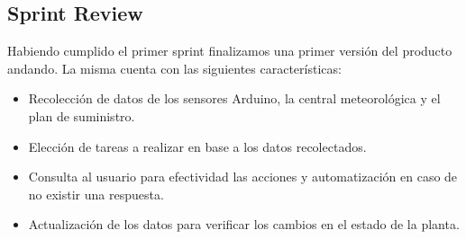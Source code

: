 \subsection{Sprint Review}
Habiendo cumplido el primer sprint finalizamos una primer versión del producto andando. 
La misma cuenta con las siguientes características:
\begin{itemize}
\item Recolección de datos de los sensores Arduino, la central meteorológica y el plan de suministro.
\item Elección de tareas a realizar en base a los datos recolectados.
\item Consulta al usuario para efectividad las acciones y automatización en caso de no existir una respuesta.
\item Actualización de los datos para verificar los cambios en el estado de la planta.
\end{itemize}

